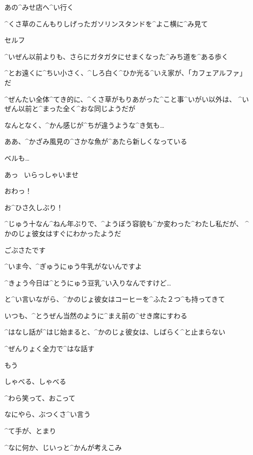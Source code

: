 \page[58]
\Narrator あの^{みせ}{店}へ^{い}{行}く

\page
\Narrator ^{くさ}{草}のこんもりしげったガソリンスタンドを^{よこ}{横}に^{み}{見}て

\Sign セルフ

\Narrator ^{いぜん}{以前}よりも、さらにガタガタにせまくなった^{みち}{道}を^{ある}{歩}く

\page
\Narrator ^{とお}{遠}くに^{ちい}{小}さく、^{しろ}{白}く^{ひか}{光}る^{いえ}{家}が、「カフェアルファ」だ

\Narrator ^{ぜんたい}{全体}^{てき}{的}に、^{くさ}{草}がもりあがった^{こと}{事}^{いがい}{以外}は、
^{いぜん}{以前}と^{まった}{全}く^{おな}{同}じようだが

\Narrator なんとなく、^{かん}{感}じが^{ちが}{違}うような^{き}{気}も…

\page
\Narrator ああ、^{かざみ}{風見}の^{さかな}{魚}が^{あたら}{新}しくなっている

\Narrator ベルも…

\page
\Alpha あっ
\ いらっしゃいませ

\Alpha おわっ！

\Alpha お^{ひさ}{久}しぶり！

\Narrator ^{じゅう}{十}なん^{ねん}{年}ぶりで、^{ようぼう}{容貌}も^{か}{変}わった^{わたし}{私}だが、
^{かのじょ}{彼女}はすぐにわかったようだ

\Alpha ごぶさたです

\page
\Alpha ^{いま}{今}、^{ぎゅうにゅう}{牛乳}がないんですよ

\Alpha ^{きょう}{今日}は^{とうにゅう}{豆乳}^{い}{入}りなんですけど…

\Narrator と^{い}{言}いながら、^{かのじょ}{彼女}はコーヒーを^{ふた}{２}つ^{も}{持}ってきて

\Narrator いつも、^{とうぜん}{当然}のように^{まえ}{前}の^{せき}{席}にすわる

\page[65]
\Narrator ^{はなし}{話}が^{はじ}{始}まると、^{かのじょ}{彼女}は、しばらく^{と}{止}まらない

\Narrator ^{ぜんりょく}{全力}で^{はな}{話}す

\Narrator もう

\Narrator しゃべる、しゃべる

\page
\Narrator ^{わら}{笑}って、おこって

\Narrator なにやら、ぶつくさ^{い}{言}う

\page
\Narrator ^{て}{手}が、とまり

\page
\Narrator ^{なに}{何}か、じいっと^{かんが}{考}えこみ

